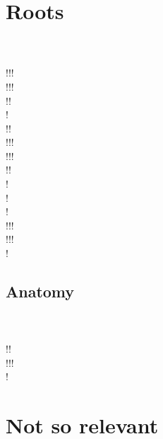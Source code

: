 \documentclass[a4paper,10pt]{article}
\begin{document}
\section{Roots}
\cite{felipussi08}\\
\cite{yugan10}\\
!!!\cite{fernandez10}\\
!!!\cite{french08}\\
!!\cite{goclawski09}\\
!\cite{guo11}\\
!!\cite{miyamura07}\\
!!!\cite{muehlich08}\\
!!!\cite{page08}\\
!!\cite{tajima11}\\
!\cite{vandenhirtz10}\\
!\cite{wu11}\\
!\cite{haiwen09}\\
!!!\cite{ying11b}\\
!!!\cite{tonglin08}\\
!\cite{zobel08}

\subsection{Anatomy}
\cite{bagbreveci11}\\
\cite{avila-montes10}\\
!!\cite{delibasis10}\\
!!!\cite{mille09}\\
!\cite{jing11}

\section{Not so relevant}

\printbibliography
\end{document}
